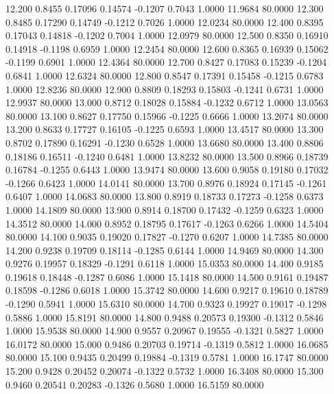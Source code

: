   12.200   0.8455   0.17096   0.14574  -0.1207   0.7043   1.0000  11.9684  80.0000
  12.300   0.8485   0.17290   0.14749  -0.1212   0.7026   1.0000  12.0234  80.0000
  12.400   0.8395   0.17043   0.14818  -0.1202   0.7004   1.0000  12.0979  80.0000
  12.500   0.8350   0.16910   0.14918  -0.1198   0.6959   1.0000  12.2454  80.0000
  12.600   0.8365   0.16939   0.15062  -0.1199   0.6901   1.0000  12.4364  80.0000
  12.700   0.8427   0.17083   0.15239  -0.1204   0.6841   1.0000  12.6324  80.0000
  12.800   0.8547   0.17391   0.15458  -0.1215   0.6783   1.0000  12.8236  80.0000
  12.900   0.8809   0.18293   0.15803  -0.1241   0.6731   1.0000  12.9937  80.0000
  13.000   0.8712   0.18028   0.15884  -0.1232   0.6712   1.0000  13.0563  80.0000
  13.100   0.8627   0.17750   0.15966  -0.1225   0.6666   1.0000  13.2074  80.0000
  13.200   0.8633   0.17727   0.16105  -0.1225   0.6593   1.0000  13.4517  80.0000
  13.300   0.8702   0.17890   0.16291  -0.1230   0.6528   1.0000  13.6680  80.0000
  13.400   0.8806   0.18186   0.16511  -0.1240   0.6481   1.0000  13.8232  80.0000
  13.500   0.8966   0.18739   0.16784  -0.1255   0.6443   1.0000  13.9474  80.0000
  13.600   0.9058   0.19180   0.17032  -0.1266   0.6423   1.0000  14.0141  80.0000
  13.700   0.8976   0.18924   0.17145  -0.1261   0.6407   1.0000  14.0683  80.0000
  13.800   0.8919   0.18733   0.17273  -0.1258   0.6373   1.0000  14.1809  80.0000
  13.900   0.8914   0.18700   0.17432  -0.1259   0.6323   1.0000  14.3512  80.0000
  14.000   0.8952   0.18795   0.17617  -0.1263   0.6266   1.0000  14.5404  80.0000
  14.100   0.9035   0.19020   0.17827  -0.1270   0.6207   1.0000  14.7385  80.0000
  14.200   0.9238   0.19709   0.18114  -0.1285   0.6144   1.0000  14.9469  80.0000
  14.300   0.9276   0.19957   0.18329  -0.1291   0.6118   1.0000  15.0353  80.0000
  14.400   0.9185   0.19618   0.18448  -0.1287   0.6086   1.0000  15.1418  80.0000
  14.500   0.9161   0.19487   0.18598  -0.1286   0.6018   1.0000  15.3742  80.0000
  14.600   0.9217   0.19610   0.18789  -0.1290   0.5941   1.0000  15.6310  80.0000
  14.700   0.9323   0.19927   0.19017  -0.1298   0.5886   1.0000  15.8191  80.0000
  14.800   0.9488   0.20573   0.19300  -0.1312   0.5846   1.0000  15.9538  80.0000
  14.900   0.9557   0.20967   0.19555  -0.1321   0.5827   1.0000  16.0172  80.0000
  15.000   0.9486   0.20703   0.19714  -0.1319   0.5812   1.0000  16.0685  80.0000
  15.100   0.9435   0.20499   0.19884  -0.1319   0.5781   1.0000  16.1747  80.0000
  15.200   0.9428   0.20452   0.20074  -0.1322   0.5732   1.0000  16.3408  80.0000
  15.300   0.9460   0.20541   0.20283  -0.1326   0.5680   1.0000  16.5159  80.0000
